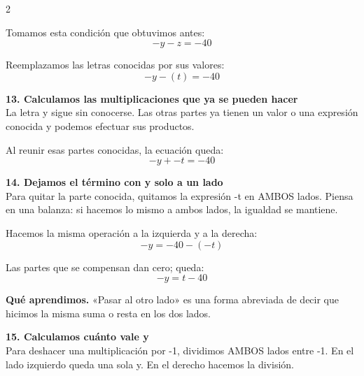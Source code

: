 \documentclass[11pt,a4paper,landscape]{article}
\begin{document}
\begin{multicols*}{2}
\begin{minipage}{\linewidth}
\par\smallskip Tomamos esta condición que obtuvimos antes:
\[-y - z = -40\]
\par\smallskip Reemplazamos las letras conocidas por sus valores:
\[-y - \left(t\right)=-40\]
\end{minipage}\par\medskip
\noindent\begin{minipage}{\linewidth}\textbf{13. Calculamos las multiplicaciones que ya se pueden hacer}\\[2pt]La letra y sigue sin conocerse. Las otras partes ya tienen un valor o una expresión conocida y podemos efectuar sus productos.
\par{}\par\smallskip
\par\smallskip Al reunir esas partes conocidas, la ecuación queda:
\[-y + - t=-40\]
\end{minipage}\par\medskip
\noindent\begin{minipage}{\linewidth}\textbf{14. Dejamos el término con y solo a un lado}\\[2pt]Para quitar la parte conocida, quitamos la expresión -t en AMBOS lados. Piensa en una balanza: si hacemos lo mismo a ambos lados, la igualdad se mantiene.
\par\smallskip Hacemos la misma operación a la izquierda y a la derecha:
\[-y=-40-\left(- t\right)\]
\par\smallskip Las partes que se compensan dan cero; queda:
\[-y=t - 40\]
\par\smallskip\textbf{Qué aprendimos.} «Pasar al otro lado» es una forma abreviada de decir que hicimos la misma suma o resta en los dos lados.
\end{minipage}\par\medskip
\noindent\begin{minipage}{\linewidth}\textbf{15. Calculamos cuánto vale y}\\[2pt]Para deshacer una multiplicación por -1, dividimos AMBOS lados entre -1. En el lado izquierdo queda una sola y. En el derecho hacemos la división.

\end{minipage}
\end{multicols*}
\end{document}
